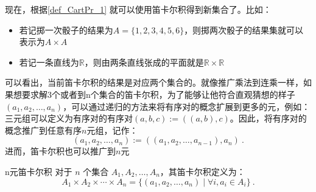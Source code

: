 现在，根据\autoref{def_CartPr_1} 就可以使用笛卡尔积得到新集合了。比如：
\begin{itemize}
\item 若记掷一次骰子的结果为$A=\{1, 2, 3, 4, 5, 6\}$，则掷两次骰子的结果集就可以表示为$A\times A$
\item 若记一条直线为${\mathbb R}$，则由两条直线张成的平面就是${\mathbb R}\times{\mathbb R}$
\end{itemize}
可以看出，当前笛卡尔积的结果是对应两个集合的。就像推广乘法到连乘一样，如果想要求解3个或者到n个集合的笛卡尔积，为了能够让他符合直观猜想的样子$(a_1, a_2, \ldots, a_n)$，可以通过递归的方法来将有序对的概念扩展到更多的元，例如：三元组可以定义为有序对的有序对$(a, b, c) := ((a, b), c)$。因此，将有序对的概念推广到任意有序$n$元组，记作：
\begin{equation}
(a_1, a_2, \ldots, a_n) := ((a_1, a_2, \ldots, a_{n-1}), a_n)~.
\end{equation}
进而，笛卡尔积也可以推广到$n$元
\begin{definition}{n元笛卡尔积}
对于 $n$ 个集合 $A_1, A_2, \ldots, A_n$，其笛卡尔积定义为：
\begin{equation}
A_1 \times A_2 \times \cdots \times A_n = \{(a_1, a_2, \ldots, a_n) \mid \forall i,a_i \in A_i \} ~.
\end{equation}
\end{definition}